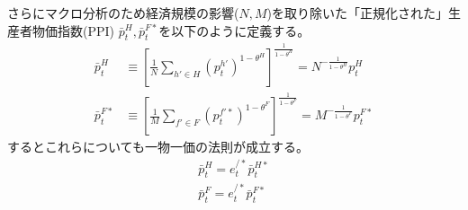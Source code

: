 さらにマクロ分析のため経済規模の影響(\(N,M\))を取り除いた「正規化された」生産者物価指数(PPI)
\(\bar{p}_t^H, \bar{p}_t^{F*}\)を以下のように定義する。
\begin{align}
    \label{form:model_households_indices_aggregation_stage1a_ppi_definitions_p_H_bar_def}
        \bar{p}_t^H&\equiv\left[\frac{1}{N}\sum_{h'\in H}(p_t^{h'})^{1-\theta^H}\right]^{\frac{1}{1-\theta^H}}=N^{-\frac{1}{1-\theta^H}}p_t^H \\
    \label{form:model_households_indices_aggregation_stage1a_ppi_definitions_p_F_star_bar_def}
        \bar{p}_t^{F*}&\equiv\left[\frac{1}{M}\sum_{f'\in F}(p_t^{f'*})^{1-\theta^F}\right]^{\frac{1}{1-\theta^F}}=M^{-\frac{1}{1-\theta^F}}p_t^{F*}
\end{align}
するとこれらについても一物一価の法則が成立する。
\begin{align}
    \label{form:model_households_indices_aggregation_stage1a_ppi_definitions_p_H_bar_lop}
        \bar{p}_t^H=e_t^{/*}\bar{p}_t^{H*}\\
    \label{form:model_households_indices_aggregation_stage1a_ppi_definitions_p_F_bar_lop}
        \bar{p}_t^F=e_t^{/*}\bar{p}_t^{F*}
\end{align}

